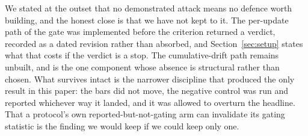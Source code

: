 We stated at the outset that no demonstrated attack means no defence worth
building, and the honest close is that we have not kept to it. The per-update path
of the gate was implemented before the criterion returned a verdict, recorded as a
dated revision rather than absorbed, and Section~\ref{sec:setup} states what that
costs if the verdict is a stop. The cumulative-drift path remains unbuilt, and is
the one component whose absence is structural rather than chosen. What survives
intact is the narrower discipline that produced the only result in this paper: the
bars did not move, the negative control was run and reported whichever way it
landed, and it was allowed to overturn the headline. That a protocol's own
reported-but-not-gating arm can invalidate its gating statistic is the finding we
would keep if we could keep only one.
